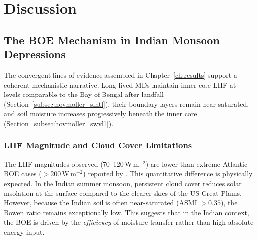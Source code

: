 
\ifpdf
\graphicspath{{chapters/Figs/}{chapters/Figs/Raster/}{Figs/PDF/}{Figs/}}
\else
\graphicspath{{chapters/Figs/}{chapters/Figs/Vector/}{Figs/}}
\fi

\chapter{Discussion}
\label{ch:discussion}

\section{The BOE Mechanism in Indian Monsoon Depressions}
\label{sec:disc_boe}

The convergent lines of evidence assembled in
Chapter~\ref{ch:results} support a coherent mechanistic narrative.
Long-lived MDs maintain inner-core LHF at levels comparable to the
Bay of Bengal after landfall (Section~\ref{subsec:hovmoller_slhtf}),
their boundary layers remain near-saturated, and soil moisture
increases progressively beneath the inner core
(Section~\ref{subsec:hovmoller_swvl1}).

\subsection{LHF Magnitude and Cloud Cover Limitations}
The LHF magnitudes observed (70--120\,W\,m$^{-2}$) are lower than
extreme Atlantic BOE cases ($>200$\,W\,m$^{-2}$) reported by
\autocite{andersen2014insights}. This quantitative difference is
physically expected. In the Indian summer monsoon, persistent cloud
cover reduces solar insolation at the surface compared to the clearer
skies of the US Great Plains. However, because the Indian soil is
often near-saturated (ASMI $> 0.35$), the Bowen ratio remains
exceptionally low. This suggests that in the Indian context, the BOE
is driven by the \emph{efficiency} of moisture transfer rather than
high absolute energy input.


